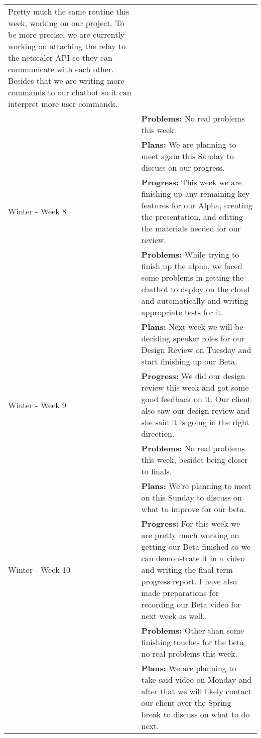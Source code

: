 \begin{longtable}[ht]{| p{1.5cm} | p{13.5cm} |}
     Pretty much the same routine this week, working on our project. 
     To be more precise, we are currently working on attaching the relay to the netscaler API so they can communicate with each other. 
     Besides that we are writing more commands to our chatbot so it can interpret more user commands.
     \\ & \textbf{Problems:}
     No real problems this week.
     \\ & \textbf{Plans:}
     We are planning to meet again this Sunday to discuss on our progress.
     \\
     \hline
     Winter - Week 8 &
     \textbf{Progress:}
     This week we are finishing up any remaining key features for our Alpha, creating the presentation, and editing the materials needed for our review.
     \\ & \textbf{Problems:}
     While trying to finish up the alpha, we faced some problems in getting the chatbot to deploy on the cloud and automatically and writing appropriate tests for it. 
     \\ & \textbf{Plans:}
     Next week we will be deciding speaker roles for our Design Review on Tuesday and start finishing up our Beta.
     \\
     \hline
     Winter - Week 9 &
     \textbf{Progress:}
     We did our design review this week and got some good feedback on it. 
     Our client also saw our design review and she said it is going in the right direction.
     \\ & \textbf{Problems:}
     No real problems this week, besides being closer to finals.
     \\ & \textbf{Plans:}
     We're planning to meet on this Sunday to discuss on what to improve for our beta.
     \\
     \hline
     Winter - Week 10 &
     \textbf{Progress:}
     For this week we are pretty much working on getting our Beta finished so we can demonstrate it in a video and writing the final term progress report. 
     I have also made preparations for recording our Beta video for next week as well.
     \\ & \textbf{Problems:}
     Other than some finishing touches for the beta, no real problems this week.
     \\ & \textbf{Plans:}
     We are planning to take said video on Monday and after that we will likely contact our client over the Spring break to discuss on what to do next.
     \\
     \hline
\end{longtable}